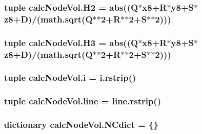 \subsubsection[{H2}]{\setlength{\rightskip}{0pt plus 5cm}tuple calc\+Node\+Vol.\+H2 = abs((Q$\ast${\bf x8}+R$\ast${\bf y8}+S$\ast${\bf z8}+{\bf D})/(math.\+sqrt(Q$\ast$$\ast$2+R$\ast$$\ast$2+S$\ast$$\ast$2)))}\label{namespacecalcNodeVol_a3dd3091d10a8de8da0a378469ab901f4}
\hypertarget{namespacecalcNodeVol_a291f5664c56e602ca7588a37d3e9ec59}{}
\subsubsection[{H3}]{\setlength{\rightskip}{0pt plus 5cm}tuple calc\+Node\+Vol.\+H3 = abs((Q$\ast${\bf x8}+R$\ast${\bf y8}+S$\ast${\bf z8}+{\bf D})/(math.\+sqrt(Q$\ast$$\ast$2+R$\ast$$\ast$2+S$\ast$$\ast$2)))}\label{namespacecalcNodeVol_a291f5664c56e602ca7588a37d3e9ec59}
\hypertarget{namespacecalcNodeVol_a64c45dcfc518f39eea16b41d63476c80}{}
\subsubsection[{i}]{\setlength{\rightskip}{0pt plus 5cm}tuple calc\+Node\+Vol.\+i = i.\+rstrip()}\label{namespacecalcNodeVol_a64c45dcfc518f39eea16b41d63476c80}
\hypertarget{namespacecalcNodeVol_ab892d7af59cf1ab14d8c73aea66077d0}{}
\subsubsection[{line}]{\setlength{\rightskip}{0pt plus 5cm}tuple calc\+Node\+Vol.\+line = line.\+rstrip()}\label{namespacecalcNodeVol_ab892d7af59cf1ab14d8c73aea66077d0}
\hypertarget{namespacecalcNodeVol_a44bfcb22d05381f9c292a4a34c7d9acf}{}
\subsubsection[{N\+Cdict}]{\setlength{\rightskip}{0pt plus 5cm}dictionary calc\+Node\+Vol.\+N\+Cdict = \{\}}\label{namespacecalcNodeVol_a44bfcb22d05381f9c292a4a34c7d9acf}
\hypertarget{namespacecalcNodeVol_a9ea89ae9b0c2f371d156b0ae2aeeb273}{}
